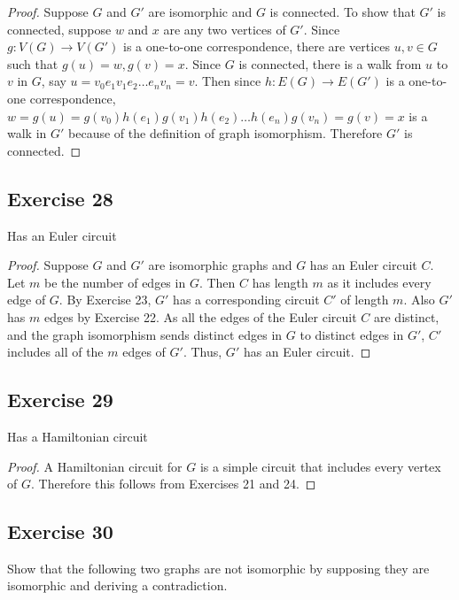 \documentclass[14pt]{extarticle}
\begin{document}
\begin{proof}
    Suppose \(G\) and \(G'\) are isomorphic and \(G\) is connected. To show that \(G'\) is connected, suppose \(w\) and
    \(x\) are any two vertices of \(G'\). Since \(g: V(G) \to V(G')\) is a one-to-one correspondence, there are vertices
    \(u, v \in G\) such that \(g(u) = w, g(v) = x\). Since \(G\) is connected, there is a walk from \(u\) to \(v\) in \(G\),
    say \(u = v_0e_1v_1e_2 \ldots e_nv_n = v\). Then since \(h: E(G) \to E(G')\) is a one-to-one correspondence, \(w = g(u) =
    g(v_0)h(e_1)g(v_1)h(e_2) \ldots h(e_n)g(v_n) = g(v) = x\) is a walk in \(G'\) because of the definition of graph isomorphism.
    Therefore \(G'\) is connected.
\end{proof}

\subsection{Exercise 28}
Has an Euler circuit

\begin{proof}
    Suppose \(G\) and \(G'\) are isomorphic graphs and \(G\) has an Euler circuit \(C\). Let \(m\) be the number of edges in
    \(G\). Then \(C\) has length \(m\) as it includes every edge of \(G\). By Exercise 23, \(G'\) has a corresponding circuit
    \(C'\) of length \(m\). Also \(G'\) has \(m\) edges by Exercise 22. As all the edges of the Euler circuit \(C\) are
    distinct, and the graph isomorphism sends distinct edges in \(G\) to distinct edges in \(G'\), \(C'\) includes all of the
    \(m\) edges of \(G'\). Thus, \(G'\) has an Euler circuit.
\end{proof}

\subsection{Exercise 29}
Has a Hamiltonian circuit

\begin{proof}
    A Hamiltonian circuit for \(G\) is a simple circuit that includes every vertex of \(G\). Therefore this follows from
    Exercises 21 and 24.
\end{proof}

\subsection{Exercise 30}
Show that the following two graphs are not isomorphic by supposing they are isomorphic and deriving a contradiction.
\end{document}
